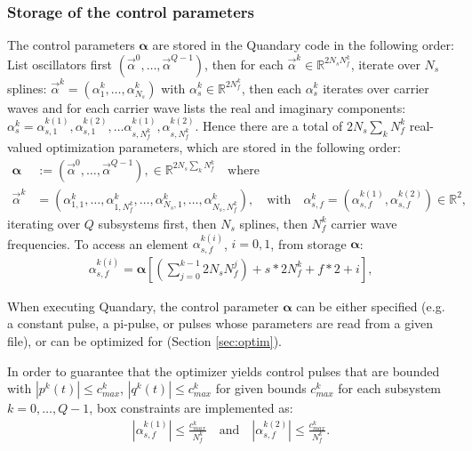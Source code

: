 \documentclass[11pt]{article}
\newcommand{\R}{\mathds{R}}
\newcommand{\bfa}{\boldsymbol{\alpha}}
\newcommand{\bs}[1]{{\boldsymbol{#1}}}
\begin{document}
\subsubsection{Storage of the control parameters}

The control parameters $\bs{\alpha}$ are stored in the Quandary code in the following order: List oscillators first $(\vec{\alpha}^0, \dots, \vec{\alpha}^{Q-1})$, then for each $\vec{\alpha}^k \in
\R^{2N_sN_f^k}$, iterate over $N_s$ splines: $\vec{\alpha}^k =
(\alpha^k_1,\dots, \alpha^k_{N_s})$ with $\alpha^k_s \in \R^{2N_f^k}$, then each
$\alpha^k_s$ iterates over carrier waves and for each carrier wave lists
the real and imaginary components: $\alpha^k_s = \alpha^{k(1)}_{s,1}, \alpha^{k(2)}_{s,1},
\dots \alpha^{k(1)}_{s,N_f^k}, \alpha^{k(2)}_{s,N_f^k}$. Hence there are a total of $2N_s\sum_k N_f^k$ real-valued optimization parameters, which are stored in the following order:
  \begin{align}
    \boldsymbol{\alpha} &:= \left( \vec{\alpha}^0, \dots, \vec{\alpha}^{Q-1} \right), \in
    \mathds{R}^{2N_s\sum_k N_f^k} \quad \text{where}\\
    \vec{\alpha}^k &= \left( \alpha_{1,1}^k,\dots, \alpha_{1,N_f^k}^k, \dots,
    \alpha_{N_s,1}^{k}, \dots, \alpha_{N_s,N_f^k}^k \right), \quad \text{with} \quad
    \alpha_{s,f}^k = \left(\alpha_{s,f}^{k(1)}, \alpha_{s,f}^{k(2)} \right) \in
    \R^2,
  \end{align}
  iterating over $Q$ subsystems first, then $N_s$ splines, then $N_f^k$ carrier wave
  frequencies. To access an element $\alpha_{s,f}^{k(i)}$, $i=0,1$, from storage $\bfa$:
  \begin{align}
    \alpha_{s,f}^{k(i)} = \bfa[ \left(\sum_{j=0}^{k-1} 2N_sN_f^j\right) + s*2N_f^k + f*2 + i ],
  \end{align}

  When executing Quandary, the control parameter $\boldsymbol{\alpha}$ can be either specified (e.g. a constant pulse, a pi-pulse, or 
  pulses whose parameters are read from a given file), or can be optimized for (Section \ref{sec:optim}). 
  
  In order to guarantee that the optimizer yields control pulses that are
  bounded with $|p^k(t)| \leq c^k_{max}$, $|q^k(t)| \leq c^k_{max}$ for given bounds $c^k_{max}$ for each  
  subsystem $k=0,\dots, Q-1$, box constraints are implemented as:
   \begin{align}
     | \alpha_{s,f}^{k(1)}| \leq \frac{c^k_{max}}{N_f^k} \quad \text{and} \quad |
     \alpha_{s,f}^{k(2)} | \leq \frac{c^k_{max}}{N_f^k}.
   \end{align}
\end{document}
